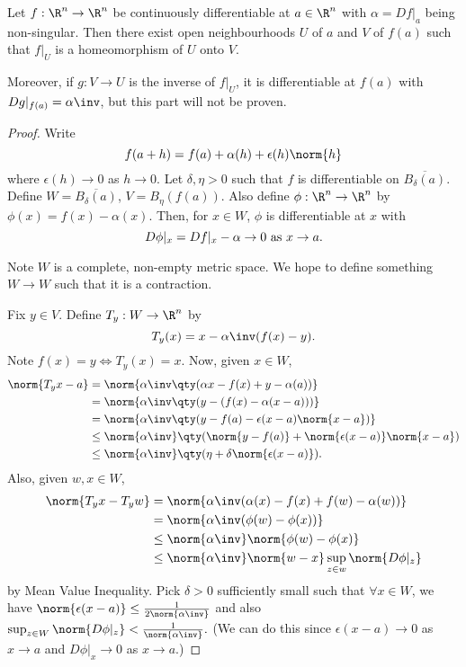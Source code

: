 \begin{theorem} \label{thm:2.16}
Let $f: \R^n\to \R^n$ be continuously differentiable at $a \in \R^n$ with $\alpha = Df|_a$ being non-singular. 
Then there exist open neighbourhoods $U$ of $a$ and $V$ of $f(a)$ such that $f|_U$ is a homeomorphism of $U$ onto $V$.

Moreover, if $g: V\to U$ is the inverse of $f|_U$, it is differentiable at $f(a)$ with $Dg|_{f(a)} = \alpha\inv$, but this part will not be proven.
\end{theorem}

\begin{proof}
Write \[f(a+h) = f(a) + \alpha(h) +\epsilon(h) \norm{h} \] where $\epsilon(h)\to 0$ as $h\to 0$. Let $\delta,\eta >0$ such that $f$ is differentiable on $\overline{B_\delta(a)}$. Define $W = \overline{B_\delta(a)}$, $V = B_\eta(f(a))$. Also define $\phi: \R^n\to \R^n$ by $\phi(x) = f(x) - \alpha(x)$. Then, for $x\in W$, $\phi$ is differentiable at $x$ with \[D\phi|_x = Df|_x - \alpha \to 0 \textup{ as } x\to a.\]

Note $W$ is a complete, non-empty metric space. We hope to define something $W\to W$ such that it is a contraction. 

Fix $y\in V$. Define $T_y: W\to \R^n$ by \[T_y(x) = x-\alpha\inv(f(x) - y).\] Note $f(x) = y\Leftrightarrow T_y(x) = x$. Now, given $x\in W$, 
\begin{align*}
    \norm{T_yx - a} &= \norm{\alpha\inv \qty( \alpha x - f(x) + y - \alpha(a) )} \\
    &= \norm{\alpha\inv \qty( y - (f(x) - \alpha(x-a)) )} \\
    &= \norm{\alpha\inv \qty( y -f(a) - \epsilon(x-a)\norm{x-a} )} \\
    &\leq \norm{\alpha\inv} \qty( \norm{y-f(a)} + \norm{\epsilon(x-a)}\norm{x-a} ) \\
    &\leq \norm{\alpha\inv} \qty(\eta + \delta\norm{\epsilon(x-a)}).
\end{align*}
Also, given $w,x\in W$,
\begin{align*}
    \norm{T_yx - T_yw} &= \norm{\alpha\inv (\alpha(x) - f(x) + f(w) - \alpha(w))}\\
    &= \norm{\alpha\inv (\phi(w) - \phi(x))}\\
    &\leq \norm{\alpha\inv} \norm{\phi(w) - \phi(x)}\\
    &\leq \norm{\alpha\inv}\norm{w-x}\sup_{z\in w}\norm{D\phi|_z}
\end{align*}
by Mean Value Inequality. Pick $\delta>0$ sufficiently small such that $\forall x\in W$, we have $\norm{\epsilon(x-a)}\leq \frac{1}{2\norm{\alpha\inv}}$ and also $\sup_{z\in W}\norm{D\phi|_z} < \frac{1}{\norm{\alpha\inv}}.$ (We can do this since $\epsilon(x-a)\to 0$ as $x\to a$ and $D\phi|_x \to 0$ as $x\to a$.)


\end{proof}
